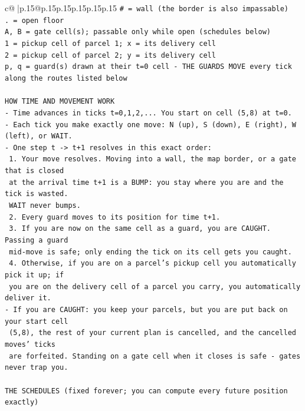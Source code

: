 \documentclass{article}
\begin{document}
{\begin{supertabular}{c@{$\;$}|p{.15\linewidth}@{}p{.15\linewidth}p{.15\linewidth}p{.15\linewidth}p{.15\linewidth}p{.15\linewidth}}
{{{\texttt{\# = wall (the border is also impassable)} \\
\texttt{. = open floor} \\
\texttt{A, B = gate cell(s); passable only while open (schedules below)} \\
\texttt{1 = pickup cell of parcel 1; x = its delivery cell} \\
\texttt{2 = pickup cell of parcel 2; y = its delivery cell} \\
\texttt{p, q = guard(s) drawn at their t=0 cell {-} THE GUARDS MOVE every tick along the routes listed below} \\
\\ 
\texttt{HOW TIME AND MOVEMENT WORK} \\
\texttt{{-} Time advances in ticks t=0,1,2,... You start on cell (5,8) at t=0.} \\
\texttt{{-} Each tick you make exactly one move: N (up), S (down), E (right), W (left), or WAIT.} \\
\texttt{{-} One step t {-}> t+1 resolves in this exact order:} \\
\texttt{  1. Your move resolves. Moving into a wall, the map border, or a gate that is closed} \\
\texttt{     at the arrival time t+1 is a BUMP: you stay where you are and the tick is wasted.} \\
\texttt{     WAIT never bumps.} \\
\texttt{  2. Every guard moves to its position for time t+1.} \\
\texttt{  3. If you are now on the same cell as a guard, you are CAUGHT. Passing a guard} \\
\texttt{     mid{-}move is safe; only ending the tick on its cell gets you caught.} \\
\texttt{  4. Otherwise, if you are on a parcel's pickup cell you automatically pick it up; if} \\
\texttt{     you are on the delivery cell of a parcel you carry, you automatically deliver it.} \\
\texttt{{-} If you are CAUGHT: you keep your parcels, but you are put back on your start cell} \\
\texttt{  (5,8), the rest of your current plan is cancelled, and the cancelled moves' ticks} \\
\texttt{  are forfeited. Standing on a gate cell when it closes is safe {-} gates never trap you.} \\
\\ 
\texttt{THE SCHEDULES (fixed forever; you can compute every future position exactly)} \\
}}}
\end{supertabular}}
\end{document}
